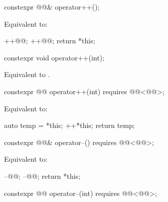%
\begin{itemdecl}
constexpr @@& operator++();
\end{itemdecl}

\begin{itemdescr}
\pnum
\effects
Equivalent to:
\begin{codeblock}
++@@;
++@@;
return *this;
\end{codeblock}
\end{itemdescr}

%
\begin{itemdecl}
constexpr void operator++(int);
\end{itemdecl}

\begin{itemdescr}
\pnum
\effects
Equivalent to .
\end{itemdescr}

%
\begin{itemdecl}
constexpr @@ operator++(int) requires @@<@@>;
\end{itemdecl}

\begin{itemdescr}
\pnum
\effects
Equivalent to:
\begin{codeblock}
auto temp = *this;
++*this;
return temp;
\end{codeblock}
\end{itemdescr}

%
\begin{itemdecl}
constexpr @@& operator--() requires @@<@@>;
\end{itemdecl}

\begin{itemdescr}
\pnum
\effects
Equivalent to:
\begin{codeblock}
--@@;
--@@;
return *this;
\end{codeblock}
\end{itemdescr}

%
\begin{itemdecl}
constexpr @@ operator--(int) requires @@<@@>;
\end{itemdecl}

